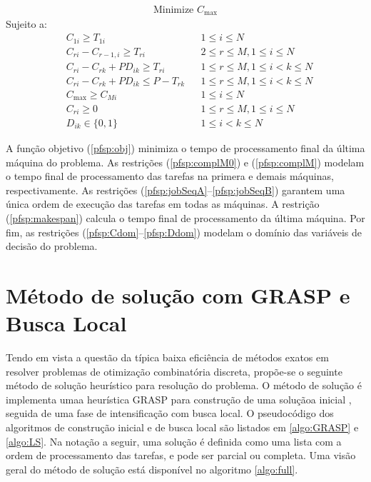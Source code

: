 \documentclass[12pt]{article}
\begin{document}
\clearpage 

\begin{align}
   \text{Minimize } C_\mathrm{max} \label{pfsp:obj}
\end{align}
Sujeito a:
\begin{align}
   & C_{1i} \geqslant T_{1i} & & 1 \leqslant i \leqslant N \label{pfsp:complM0} \\
   & C_{ri} - C_{r-1,i} \geqslant T_{ri} & & 2 \leqslant r \leqslant M, 
      1 \leqslant i \leqslant N \label{pfsp:complM} \\
   & C_{ri} - C_{rk} + PD_{ik} \geqslant T_{ri} & & 1 \leqslant r \leqslant M, 
      1 \leqslant i < k \leqslant N \label{pfsp:jobSeqA}\\
   & C_{ri} - C_{rk} + PD_{ik} \leqslant P - T_{rk} & & 1 \leqslant r \leqslant M, 
      1 \leqslant i < k \leqslant N \label{pfsp:jobSeqB} \\
   & C_\mathrm{max} \geqslant C_{Mi} & & 1 \leqslant i \leqslant N \label{pfsp:makespan} \\
   & C_{ri} \geqslant 0 & & 1 \leqslant r \leqslant M, 1 \leqslant i \leqslant N \label{pfsp:Cdom}\\
   & D_{ik} \in \{0,1\} & & 1 \leqslant i < k \leqslant N \label{pfsp:Ddom}
\end{align}

A função objetivo (\ref{pfsp:obj}) minimiza o tempo de processamento final da
última máquina do problema. As restrições (\ref{pfsp:complM0}) e
(\ref{pfsp:complM}) modelam o tempo final de processamento das tarefas na
primera e demais máquinas, respectivamente. As restrições
(\ref{pfsp:jobSeqA}--\ref{pfsp:jobSeqB}) garantem uma única ordem de execução 
das tarefas em todas as máquinas. A restrição (\ref{pfsp:makespan}) calcula o
tempo final de processamento da última máquina. Por fim, as restrições
(\ref{pfsp:Cdom}--\ref{pfsp:Ddom}) modelam o domínio das variáveis de decisão do
problema.

\section{Método de solução com GRASP e Busca Local}

Tendo em vista a questão da típica baixa eficiência de métodos exatos em
resolver problemas de otimização combinatória discreta, propõe-se o seguinte
método de solução heurístico para resolução do problema. O método de solução é
implementa umaa heurística GRASP para construção de uma soluçãoa inicial
\cite{feo1994-grasp}, seguida de uma fase de intensificação com busca local. 
O pseudocódigo dos algoritmos de construção inicial e de busca local são 
listados em \ref{algo:GRASP} e \ref{algo:LS}. 
Na notação a seguir, uma solução é definida como uma lista com a ordem de
processamento das tarefas, e pode ser parcial ou completa.
Uma visão geral do método de
solução está disponível no algoritmo \ref{algo:full}.
\end{document}
